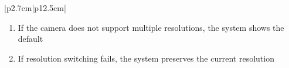 \begin{table}[H]
\begin{tabular}{|p{2.7cm}|p{12.5cm}|}
\begin{minipage}[t]{\linewidth}
                                          \begin{enumerate}[topsep=0pt,itemsep=1pt,parsep=0pt,partopsep=0pt]
                                              \item If the camera does not support multiple resolutions, the system shows the
                                                    default
                                              \item If resolution switching fails, the system preserves the current resolution
                                          \end{enumerate}
                                      \end{minipage} \\
            \hline
        \end{tabular}
        \label{tab:eng-camera-resolutions}
    \end{table}

